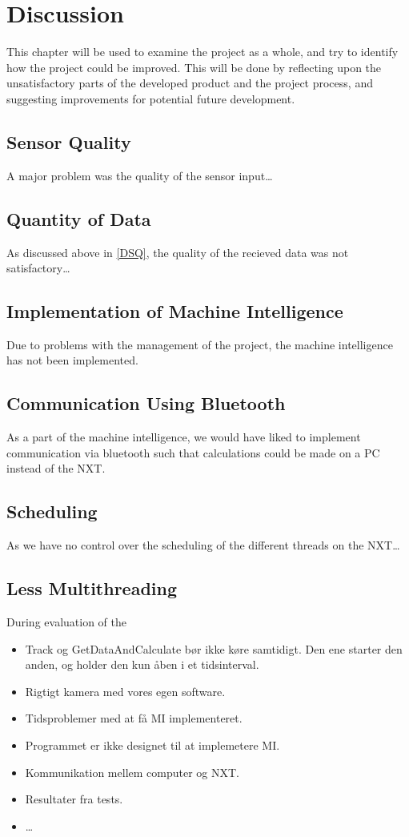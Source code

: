 \chapter{Discussion}\label{projDiscus}
This chapter will be used to examine the project as a whole, and try to identify
how the project could be improved. This will be done by reflecting upon the
unsatisfactory parts of the developed product and the project process, and
suggesting improvements for potential future development.

\section{Sensor Quality}\label{DSQ}
A major problem was the quality of the sensor input\ldots

\section{Quantity of Data}
As discussed above in \autoref{DSQ}, the quality of the recieved data was not
satisfactory\ldots

\section{Implementation of Machine Intelligence}
Due to problems with the management of the project, the machine intelligence has
not been implemented.

\section{Communication Using Bluetooth}
As a part of the machine intelligence, we would have liked to implement
communication via bluetooth such that calculations could be made on a PC instead
of the NXT.

\section{Scheduling}
As we have no control over the scheduling of the different threads on the NXT\ldots

\section{Less Multithreading}
During evaluation of the 

\begin{itemize}
  \item Track og GetDataAndCalculate bør ikke køre samtidigt. Den ene starter
  den anden, og holder den kun åben i et tidsinterval.
  \item Rigtigt kamera med vores egen software.
  \item Tidsproblemer med at få MI implementeret.
  \item Programmet er ikke designet til at implemetere MI.
  \item Kommunikation mellem computer og NXT.
  \item Resultater fra tests.
  \item \ldots
\end{itemize}
